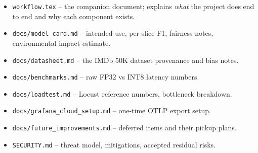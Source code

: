 \documentclass[11pt,a4paper]{article}
\begin{document}
\begin{itemize}[leftmargin=*]
\item \texttt{workflow.tex} -- the companion document; explains \emph{what} the
      project does end to end and why each component exists.
\item \texttt{docs/model\_card.md} -- intended use, per-slice F1, fairness notes,
      environmental impact estimate.
\item \texttt{docs/datasheet.md} -- the IMDb 50K dataset provenance and bias notes.
\item \texttt{docs/benchmarks.md} -- raw FP32 vs INT8 latency numbers.
\item \texttt{docs/loadtest.md} -- Locust reference numbers, bottleneck breakdown.
\item \texttt{docs/grafana\_cloud\_setup.md} -- one-time OTLP export setup.
\item \texttt{docs/future\_improvements.md} -- deferred items and their pickup plans.
\item \texttt{SECURITY.md} -- threat model, mitigations, accepted residual risks.
\end{itemize}
\end{document}
